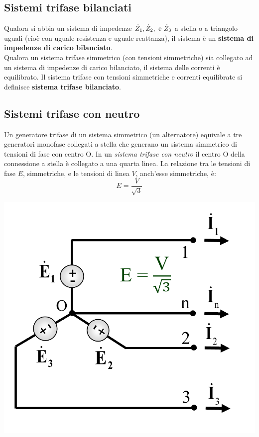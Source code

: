 \documentclass{article}
\begin{document}
\subsection{Sistemi trifase bilanciati}

Qualora si abbia un sistema di impedenze $\dot Z_1, \dot Z_2, \text{ e } \dot Z_3$ a stella o a
triangolo uguali (cioè con uguale resistenza e uguale reattanza), il sistema è un \textbf{sistema di impedenze di carico bilanciato}.\\
Qualora un sistema trifase simmetrico (con tensioni simmetriche) sia collegato ad un sistema di impedenze di carico bilanciato, il sistema
delle correnti è equilibrato. Il sistema trifase con tensioni simmetriche e correnti equilibrate si definisce \textbf{sistema trifase bilanciato}.


\subsection{Sistemi trifase con neutro}
Un generatore trifase di un sistema
simmetrico (un alternatore) equivale a tre
generatori monofase collegati a stella che
generano un sistema simmetrico di tensioni di
fase con centro O. In un \textit{sistema trifase con
neutro} il centro O della connessione a stella è
collegato a una quarta linea. La relazione tra
le tensioni di fase $E$, simmetriche, e le tensioni
di linea $V$, anch'esse simmetriche, è:
\[E = \frac{V}{\sqrt{3}}\]
\begin{center}
    \includegraphics[scale=0.27]{Image/Sistemi_trifase_neutro_1.png}
\end{center}
\end{document}
